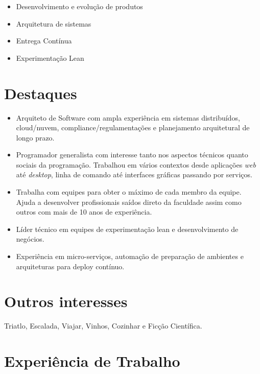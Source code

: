 \documentclass[letter,10pt]{article}
\begin{document}
\begin{itemize}
\item Desenvolvimento e evolução de produtos
\item Arquitetura de sistemas
\item Entrega Contínua
\item Experimentação Lean
\end{itemize}

\section{Destaques}

\begin{itemize}
\item Arquiteto de Software com ampla experiência em sistemas distribuídos, cloud/nuvem, compliance/regulamentações e planejamento arquitetural de longo prazo.
\item Programador generalista com interesse tanto nos aspectos
  técnicos quanto sociais da programação. Trabalhou em vários contextos desde aplicações \textit{web} até \textit{desktop}, linha de comando até interfaces
  gráficas passando por serviços.
\item Trabalha com equipes para obter o máximo de cada membro da equipe. Ajuda a desenvolver profissionais saídos direto da faculdade assim como outros com mais de 10 anos de experiência.
\item Líder técnico em equipes de experimentação lean e desenvolvimento de negócios.
\item Experiência em micro-serviços, automação de preparação de ambientes e arquiteturas para deploy contínuo.
\end{itemize}

\section{Outros interesses}

Triatlo, Escalada, Viajar, Vinhos, Cozinhar e Ficção Científica.

\section{Experiência de Trabalho}
\end{document}
